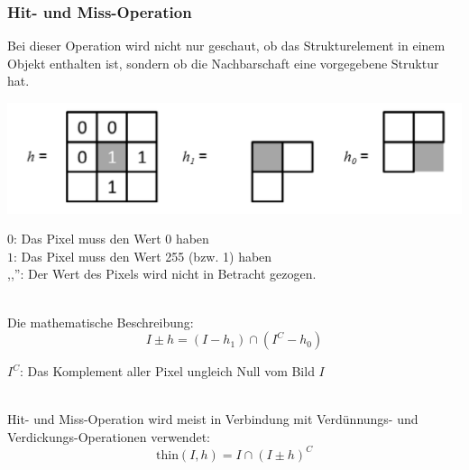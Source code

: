\subsubsection{Hit- und Miss-Operation}
Bei dieser Operation wird nicht nur geschaut, ob das Strukturelement in einem Objekt enthalten ist, sondern ob die Nachbarschaft eine vorgegebene Struktur hat.
\begin{center}
	\includegraphics[scale=0.5]{../fig/hitmiss.png}
\end{center}
\begin{footnotesize}
	$0$: Das Pixel muss den Wert 0 haben\\
	$1$: Das Pixel muss den Wert 255 (bzw. 1) haben\\
	,,'': Der Wert des Pixels wird nicht in Betracht gezogen.\\
\end{footnotesize}
\\
Die mathematische Beschreibung:
\[
	I \pm h = (I - h_1) \cap (I^C - h_0)
\]
\begin{footnotesize}
	$I^C$: Das Komplement aller Pixel ungleich Null vom Bild $I$\\
\end{footnotesize}
\\
Hit- und Miss-Operation wird meist in Verbindung mit Verdünnungs- und Verdickungs-Operationen verwendet:
\[
	\text{thin}(I,h) = I \cap (I \pm h)^C
\]
